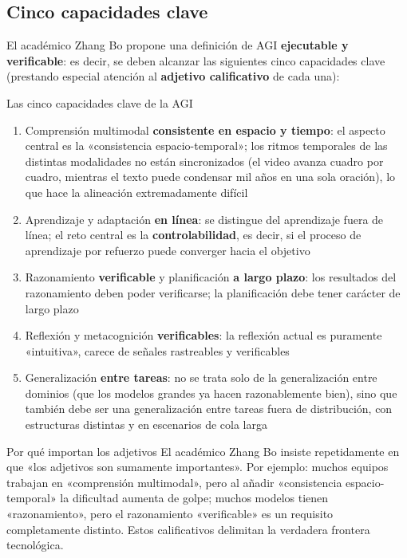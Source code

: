 \documentclass[a4paper]{article}
\begin{document}
\subsection{Cinco capacidades clave}

El académico Zhang Bo propone una definición de AGI \textbf{ejecutable y verificable}: es decir, se deben alcanzar las siguientes cinco capacidades clave (prestando especial atención al \textbf{adjetivo calificativo} de cada una):

\begin{importantbox}{Las cinco capacidades clave de la AGI}
\begin{enumerate}
\item Comprensión multimodal \textbf{consistente en espacio y tiempo}: el aspecto central es la «consistencia espacio-temporal»; los ritmos temporales de las distintas modalidades no están sincronizados (el video avanza cuadro por cuadro, mientras el texto puede condensar mil años en una sola oración), lo que hace la alineación extremadamente difícil
\item Aprendizaje y adaptación \textbf{en línea}: se distingue del aprendizaje fuera de línea; el reto central es la \textbf{controlabilidad}, es decir, si el proceso de aprendizaje por refuerzo puede converger hacia el objetivo
\item Razonamiento \textbf{verificable} y planificación \textbf{a largo plazo}: los resultados del razonamiento deben poder verificarse; la planificación debe tener carácter de largo plazo
\item Reflexión y metacognición \textbf{verificables}: la reflexión actual es puramente «intuitiva», carece de señales rastreables y verificables
\item Generalización \textbf{entre tareas}: no se trata solo de la generalización entre dominios (que los modelos grandes ya hacen razonablemente bien), sino que también debe ser una generalización entre tareas fuera de distribución, con estructuras distintas y en escenarios de cola larga
\end{enumerate}
\end{importantbox}

\begin{knowledgebox}{Por qué importan los adjetivos}
El académico Zhang Bo insiste repetidamente en que «los adjetivos son sumamente importantes». Por ejemplo: muchos equipos trabajan en «comprensión multimodal», pero al añadir «consistencia espacio-temporal» la dificultad aumenta de golpe; muchos modelos tienen «razonamiento», pero el razonamiento «verificable» es un requisito completamente distinto. Estos calificativos delimitan la verdadera frontera tecnológica.
\end{knowledgebox}
\end{document}
